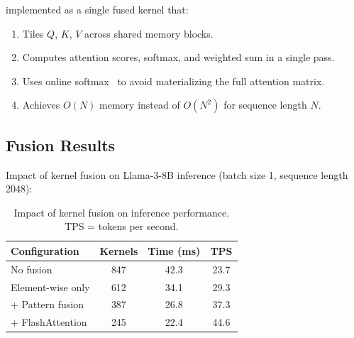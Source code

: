 implemented as a single fused kernel that:
\begin{enumerate}[leftmargin=1.4em]
    \item Tiles $Q$, $K$, $V$ across shared memory blocks.
    \item Computes attention scores, softmax, and weighted sum in a single pass.
    \item Uses online softmax~\cite{milakov2018online} to avoid materializing the full attention matrix.
    \item Achieves $O(N)$ memory instead of $O(N^2)$ for sequence length $N$.
\end{enumerate}

\subsection{Fusion Results}

Impact of kernel fusion on Llama-3-8B inference (batch size 1, sequence length 2048):

\begin{table}[H]
\centering
\small
\begin{tabular}{lccc}
\toprule
\textbf{Configuration} & \textbf{Kernels} & \textbf{Time (ms)} & \textbf{TPS} \\
\midrule
No fusion & 847 & 42.3 & 23.7 \\
Element-wise only & 612 & 34.1 & 29.3 \\
+ Pattern fusion & 387 & 26.8 & 37.3 \\
+ FlashAttention & 245 & 22.4 & 44.6 \\
\bottomrule
\end{tabular}
\caption{Impact of kernel fusion on inference performance. TPS = tokens per second.}
\label{tab:fusion_results}
\end{table}

